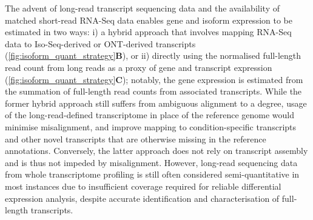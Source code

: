 The advent of long-read transcript sequencing data and the availability of matched short-read RNA-Seq data enables gene and isoform expression to be estimated in two ways: i) a hybrid approach that involves mapping RNA-Seq data to Iso-Seq-derived or ONT-derived transcripts (\cref{fig:isoform_quant_strategy}\textbf{B}), or ii) directly using the normalised full-length read count from long reads as a proxy of gene and transcript expression (\cref{fig:isoform_quant_strategy}\textbf{C}); notably, the gene expression is estimated from the summation of full-length read counts from associated transcripts. While the former hybrid approach still suffers from ambiguous alignment to a degree, usage of the long-read-defined transcriptome in place of the reference genome would minimise misalignment, and improve mapping to condition-specific transcripts and other novel transcripts that are otherwise missing in the reference annotations\cite{Au2013}. Conversely, the latter approach does not rely on transcript assembly and is thus not impeded by misalignment. However, long-read sequencing data from whole transcriptome profiling is still often considered semi-quantitative in most instances due to insufficient coverage required for reliable differential expression analysis, despite accurate identification and characterisation of full-length transcripts.  

